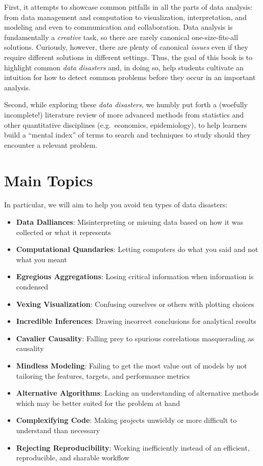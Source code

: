 \documentclass[
]{krantz}
\providecommand{\tightlist}{%
  \setlength{\itemsep}{0pt}\setlength{\parskip}{0pt}}
\begin{document}
First, it attempts to showcase common pitfalls in all the parts of data analysis: from data management and computation to visualization, interpretation, and modeling and even to communication and collaboration.
Data analysis is fundamentally a \emph{creative} task, so there are rarely canonical one-size-fits-all solutions.
Curiously, however, there are plenty of canonical \emph{issues} even if they require different solutions in different settings.
Thus, the goal of this book is to highlight common \emph{data disasters} and, in doing so, help students cultivate an intuition for how to detect common problems before they occur in an important analysis.

Second, while exploring these \emph{data disasters}, we humbly put forth a (woefully incomplete!) literature review of more advanced methods from statistics and other quantitative disciplines (e.g.~economics, epidemiology), to help learners build a ``mental index'' of terms to search and techniques to study should they encounter a relevant problem.

\hypertarget{main-topics}{%
\section{Main Topics}\label{main-topics}}

In particular, we will aim to help you avoid ten types of data disasters:

\begin{itemize}
\tightlist
\item
  \textbf{Data Dalliances}: Misinterpreting or misuing data based on how it was collected or what it represents
\item
  \textbf{Computational Quandaries}: Letting computers do what you said and not what you meant
\item
  \textbf{Egregious Aggregations}: Losing critical information when information is condensed
\item
  \textbf{Vexing Visualization}: Confusing ourselves or others with plotting choices
\item
  \textbf{Incredible Inferences}: Drawing incorrect conclusions for analytical results
\item
  \textbf{Cavalier Causality}: Falling prey to spurious correlations masquerading as causality
\item
  \textbf{Mindless Modeling}: Failing to get the most value out of models by not tailoring the features, targets, and performance metrics
\item
  \textbf{Alternative Algorithms}: Lacking an understanding of alternative methods which may be better suited for the problem at hand
\item
  \textbf{Complexifying Code}: Making projects unwieldy or more difficult to understand than necessary
\item
  \textbf{Rejecting Reproducibility}: Working inefficiently instead of an efficient, reproducible, and sharable workflow
\end{itemize}
\end{document}
